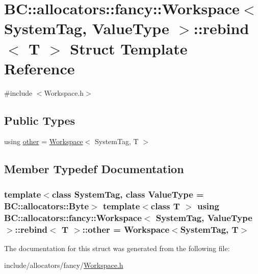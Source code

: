 \hypertarget{structBC_1_1allocators_1_1fancy_1_1Workspace_1_1rebind}{}\section{BC\+:\+:allocators\+:\+:fancy\+:\+:Workspace$<$ System\+Tag, Value\+Type $>$\+:\+:rebind$<$ T $>$ Struct Template Reference}
\label{structBC_1_1allocators_1_1fancy_1_1Workspace_1_1rebind}


{\ttfamily \#include $<$Workspace.\+h$>$}

\subsection*{Public Types}
\begin{DoxyCompactItemize}
\item 
using \hyperlink{structBC_1_1allocators_1_1fancy_1_1Workspace_1_1rebind_af433998ce3f15ac4a0995b58923bd1b8}{other} = \hyperlink{classBC_1_1allocators_1_1fancy_1_1Workspace}{Workspace}$<$ System\+Tag, T $>$
\end{DoxyCompactItemize}


\subsection{Member Typedef Documentation}
\subsubsection[{\texorpdfstring{other}{other}}]{\setlength{\rightskip}{0pt plus 5cm}template$<$class System\+Tag, class Value\+Type = B\+C\+::allocators\+::\+Byte$>$ template$<$class T $>$ using {\bf B\+C\+::allocators\+::fancy\+::\+Workspace}$<$ System\+Tag, Value\+Type $>$\+::{\bf rebind}$<$ T $>$\+::{\bf other} =  {\bf Workspace}$<$System\+Tag, T$>$}\hypertarget{structBC_1_1allocators_1_1fancy_1_1Workspace_1_1rebind_af433998ce3f15ac4a0995b58923bd1b8}{}\label{structBC_1_1allocators_1_1fancy_1_1Workspace_1_1rebind_af433998ce3f15ac4a0995b58923bd1b8}


The documentation for this struct was generated from the following file\+:\begin{DoxyCompactItemize}
\item 
include/allocators/fancy/\hyperlink{Workspace_8h}{Workspace.\+h}\end{DoxyCompactItemize}
